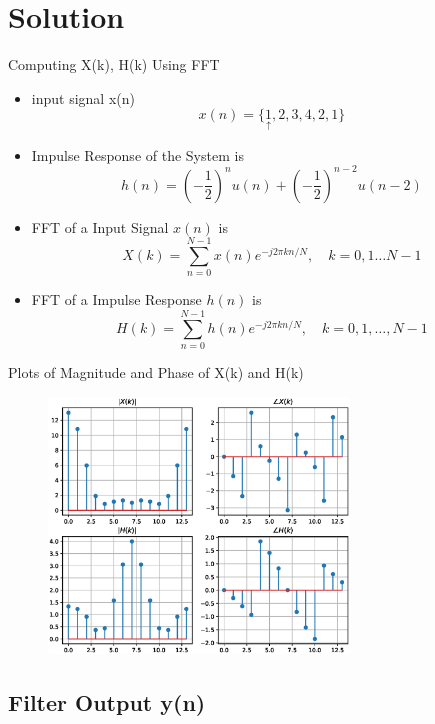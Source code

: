 \documentclass{beamer}
\begin{document}
\section{Solution}
\begin{frame}{Computing X(k), H(k) Using  FFT   }
 
\begin{itemize}
\item input signal x(n)
    \[ x(n) = \{ \underset{\uparrow}{1},2,3,4,2,1 \}\]
    \item Impulse Response of the System is
    \[h(n)=\left(-\frac{1}{2}\right)^{n} u(n)+\left(-\frac{1}{2}\right)^{n-2} u(n-2)\]
    \item FFT of a Input Signal $x(n)$ is 
     \[  X(k) = \sum_{n=0}^{N-1} x(n) e^{-j 2 \pi k n / N}, \quad k=0,1 \ldots N-1\]
    \item FFT of a Impulse Response $h(n)$ is 
    \[  H(k) = \sum_{n=0}^{N-1} h(n) e^{-j 2 \pi k n / N}, \quad k=0,1, \ldots, N-1\]
\end{itemize}

\end{frame} 
\begin{frame}{Plots of Magnitude and Phase of  X(k) and H(k) }
\begin{figure}
    \centering
    \includegraphics[width=8cm]{figs/XH_fft.eps}
\end{figure}
\subsection{Filter Output y(n)}
\end{frame} 
\end{document}
